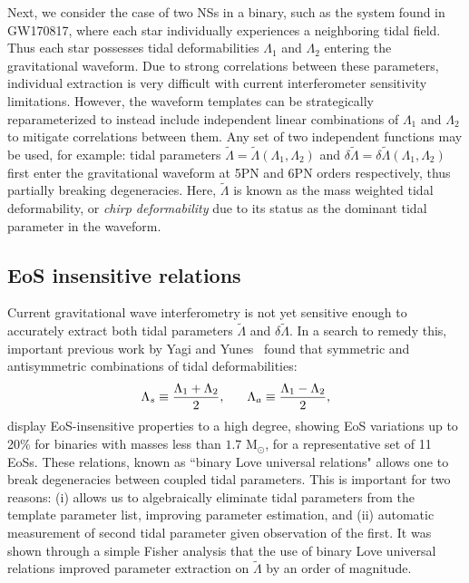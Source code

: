 \documentclass[prd,twocolumn,nofootinbib,superscriptaddress,amsmath,amssymb]{revtex4-1}
\begin{document}
Next, we consider the case of two NSs in a binary, such as the system found in GW170817, where each star 
individually experiences a neighboring tidal field.
Thus each star possesses tidal deformabilities $\Lambda_1$ and $\Lambda_2$ entering the gravitational waveform.
Due to strong correlations between these parameters, individual extraction is very difficult with current interferometer sensitivity limitations.
However, the waveform templates can be strategically reparameterized to instead include independent linear combinations of $\Lambda_1$ and $\Lambda_2$ to mitigate correlations between them. 
Any set of two independent functions may be used, for example: tidal parameters $\tilde{\Lambda}=\tilde{\Lambda}(\Lambda_1,\Lambda_2)$ and $\delta \tilde{\Lambda}=\delta \tilde{\Lambda}(\Lambda_1,\Lambda_2)$~\cite{Wade:tidalCorrections} first enter the gravitational waveform at 5PN and 6PN orders respectively, thus partially breaking degeneracies.
Here, $\tilde{\Lambda}$ is known as the mass weighted tidal deformability, or \emph{chirp deformability} due to its status as the dominant tidal parameter in the waveform. 

\subsection{EoS insensitive relations}\label{sec:eosInsensitive}
Current gravitational wave interferometry is not yet sensitive enough to accurately extract both tidal parameters $\tilde{\Lambda}$ and $\delta\tilde{\Lambda}$.
In a search to remedy this, important previous work by Yagi and Yunes~\cite{Yagi:binLove} found that symmetric and antisymmetric combinations of tidal deformabilities:
\begin{equation}
\Lambda_s \equiv \frac{\Lambda_1 + \Lambda_2}{2}, \hspace{6mm} \Lambda_a \equiv \frac{\Lambda_1 - \Lambda_2}{2},
\end{equation}
display EoS-insensitive properties to a high degree, showing EoS variations up to 20\% for binaries with masses less than $1.7 \text{ M}_{\odot}$, for a representative set of 11 EoSs. 
These relations, known as ``binary Love universal relations" allows one to break degeneracies between coupled tidal parameters.
This is important for two reasons: (i) allows us to algebraically eliminate tidal parameters from the template parameter list, improving parameter estimation, and (ii) automatic measurement of second tidal parameter given observation of the first.
It was shown through a simple Fisher analysis that the use of binary Love universal relations improved parameter extraction on $\tilde{\Lambda}$ by an order of magnitude.
\end{document}
